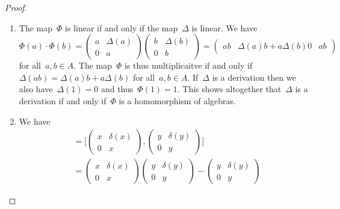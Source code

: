 \begin{proof}
  \leavevmode
  \begin{enumerate}
    \item
      The map~$\Phi$ is linear if and only if the map~$\Delta$ is linear.
      We have
      \[
        \Phi(a) \cdot \Phi(b)
        =
        \begin{pmatrix}
          a & \Delta(a) \\
          0 & a
        \end{pmatrix}
        \begin{pmatrix}
          b & \Delta(b) \\
          0 & b
        \end{pmatrix}
        =
        \begin{pmatrix}
          ab  & \Delta(a) b + a \Delta(b)
          0   & ab
        \end{pmatrix}
      \]
      for all~$a, b \in A$.
      The map~$\Phi$ is thus multiplicaitve if and only if~$\Delta(ab) = \Delta(a) b + a \Delta(b)$ for all~$a, b \in A$.
      If~$\Delta$ is a derivation then we also have~$\Delta(1) = 0$ and thus~$\Phi(1) = 1$.
      This shows altogether that~$\Delta$ is a derivation if and only if~$\Phi$ is a homomorphism of algebras.
    \item
      We have
      \begin{align*}
        [ \varphi(x), \varphi(y) ]
        &=
        \Biggl[
          \begin{pmatrix}
            x & \delta(x) \\
            0 & x
          \end{pmatrix},
          \begin{pmatrix}
            y & \delta(y) \\
            0 & y
          \end{pmatrix}
        \Biggr]
        \\
        &=
        \begin{pmatrix}
          x & \delta(x) \\
          0 & x
        \end{pmatrix}
        \begin{pmatrix}
          y & \delta(y) \\
          0 & y
        \end{pmatrix}
        -
        \begin{pmatrix}
          y & \delta(y) \\
          0 & y
        \end{pmatrix}

\end{align*}
\end{enumerate}
\end{proof}
